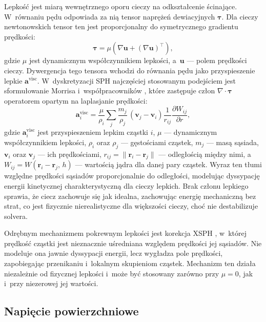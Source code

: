 Lepkość jest miarą wewnętrznego oporu cieczy na odkształcenie ścinające. W~równaniu
pędu odpowiada za nią tensor naprężeń dewiacyjnych $\boldsymbol{\tau}$. Dla cieczy
newtonowskich tensor ten jest proporcjonalny do symetrycznego gradientu prędkości:
\begin{equation}
    \boldsymbol{\tau} = \mu \left( \nabla \mathbf{u} + (\nabla \mathbf{u})^\top \right),
\end{equation}
gdzie $\mu$ jest dynamicznym współczynnikiem lepkości, a~$\mathbf{u}$ --- polem prędkości cieczy. Dywergencja tego tensora
wchodzi do równania pędu jako przyspieszenie lepkie $\mathbf{a}^{\mathrm{visc}}$.
W~dyskretyzacji SPH najczęściej stosowanym podejściem jest sformułowanie Morrisa
i~współpracowników \cite{morris1997modeling}, które zastępuje człon
$\nabla \cdot \boldsymbol{\tau}$ operatorem opartym na laplasjanie prędkości:
\begin{equation}
    \mathbf{a}^{\mathrm{visc}}_i = \frac{\mu}{\rho_i}
    \sum_j \frac{m_j}{\rho_j} \, (\mathbf{v}_j - \mathbf{v}_i)
    \frac{1}{r_{ij}} \frac{\partial W_{ij}}{\partial r},
\end{equation}
gdzie $\mathbf{a}^{\mathrm{visc}}_i$ jest przyspieszeniem lepkim cząstki $i$, $\mu$ --- dynamicznym współczynnikiem lepkości, $\rho_i$ oraz $\rho_j$ --- gęstościami cząstek, $m_j$ --- masą sąsiada, $\mathbf{v}_i$ oraz $\mathbf{v}_j$ --- ich prędkościami, $r_{ij} = \|\mathbf{r}_i - \mathbf{r}_j\|$ --- odległością między nimi, a~$W_{ij} = W(\mathbf{r}_i - \mathbf{r}_j,\,h)$ --- wartością jądra dla danej pary cząstek. Wyraz ten tłumi względne
prędkości sąsiadów proporcjonalnie do odległości, modelując dyssypację energii
kinetycznej charakterystyczną dla cieczy lepkich. Brak członu lepkiego sprawia,
że ciecz zachowuje się jak idealna, zachowując energię mechaniczną bez strat,
co jest fizycznie nierealistyczne dla większości cieczy, choć nie destabilizuje
solvera.

Odrębnym mechanizmem pokrewnym lepkości jest korekcja XSPH \cite{monaghan1989problem},
w~której prędkość cząstki jest nieznacznie uśredniana względem prędkości jej
sąsiadów. Nie modeluje ona jawnie dyssypacji energii, lecz wygładza pole prędkości,
zapobiegając przenikaniu i~lokalnym skupieniom cząstek. Mechanizm ten działa
niezależnie od fizycznej lepkości i~może być stosowany zarówno przy $\mu = 0$,
jak i~przy niezerowej jej wartości.

\subsection{Napięcie powierzchniowe}

